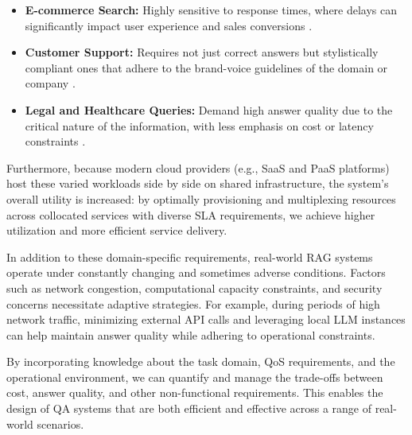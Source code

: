 \documentclass[sigconf,nonacm]{acmart}
\begin{document}
\begin{itemize}
    \item \textbf{E-commerce Search:} Highly sensitive to response times, where delays can significantly impact user experience and sales conversions \cite{vanvessum_amazon_page_speed_study, achary_latency_impact_ecommerce}.
    \item \textbf{Customer Support:} Requires not just correct answers but stylistically compliant ones that adhere to the brand-voice guidelines of the domain or company \cite{brandvoice}.
    \item \textbf{Legal and Healthcare Queries:} Demand high answer quality due to the critical nature of the information, with less emphasis on cost or latency constraints \cite{legalrag}.
\end{itemize}

Furthermore, because modern cloud providers (e.g., SaaS and PaaS platforms) host these varied workloads side by side on shared infrastructure, the system’s overall utility is increased: by optimally provisioning and multiplexing resources across collocated services with diverse SLA requirements, we achieve higher utilization and more efficient service delivery.  
  
In addition to these domain-specific requirements, real-world RAG systems operate under constantly changing and sometimes adverse conditions. Factors such as network congestion, computational capacity constraints, and security concerns necessitate adaptive strategies. For example, during periods of high network traffic, minimizing external API calls and leveraging local LLM instances can help maintain answer quality while adhering to operational constraints.


By incorporating knowledge about the task domain, QoS requirements, and the operational environment, we can quantify and manage the trade-offs between cost, answer quality, and other non-functional requirements. This enables the design of QA systems that are both efficient and effective across a range of real-world scenarios.
\end{document}
